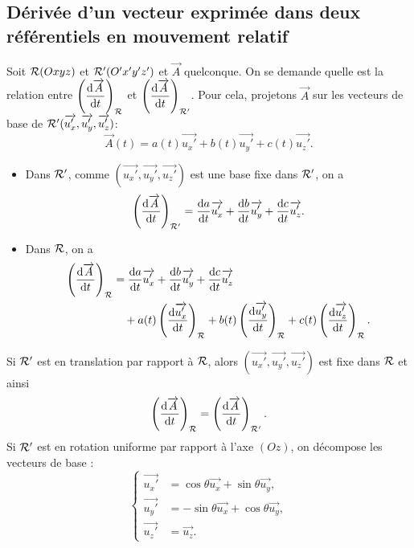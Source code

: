     \subsection{Dérivée d'un vecteur exprimée dans deux référentiels en mouvement relatif}

        Soit $\mathcal{R}(Oxyz)$ et $\mathcal{R}'(O'x'y'z')$ et $\vec{A}$ quelconque. On se demande quelle est la relation entre $\left(\dfrac{\mathrm{d}\protect\overrightarrow{{A}}}{\mathrm{d} t}\right)_{\mathcal{R}}$ et $\left(\dfrac{\mathrm{d}\protect\overrightarrow{{A}}}{\mathrm{d} t}\right)_{\mathcal{R}'}$. Pour cela, projetons $\vec{A}$ sur les vecteurs de base de $\mathcal{R}'(\protect\overrightarrow{{u_x'}},\protect\overrightarrow{{u_y'}},\protect\overrightarrow{{u_z'}})$:
        \begin{equation}
            \vec{A}(t) = a(t)\vec{u_x'}+b(t)\vec{u_y'}+c(t)\vec{u_z'}.
        \end{equation}

        \begin{itemize}
            \item Dans $\mathcal{R}'$, comme $(\vec{u_x'},\vec{u_y'},\vec{u_z'})$ est une base fixe dans $\mathcal{R}'$, on a 
            \begin{equation}
                \left(\frac{\mathrm{d}\protect\overrightarrow{{A}}}{\mathrm{d} t}\right)_{\mathcal{R}'}=\dfrac{\mathrm{d} a}{\mathrm{d} t}\protect\overrightarrow{{u_x'}}+\dfrac{\mathrm{d} b}{\mathrm{d} t}\protect\overrightarrow{{u_y'}}+\dfrac{\mathrm{d} c}{\mathrm{d} t}\protect\overrightarrow{{u_z'}}.
            \end{equation}
            \item Dans $\mathcal{R}$, on a 
            \begin{align}
                \left(\frac{\mathrm{d}\protect\overrightarrow{{A}}}{\mathrm{d} t}\right)_{\mathcal{R}}
                &=\frac{\mathrm{d} a}{\mathrm{d} t}\protect\overrightarrow{{u_x'}}+\frac{\mathrm{d} b}{\mathrm{d} t}\protect\overrightarrow{{u_y'}}+\frac{\mathrm{d} c}{\mathrm{d} t}\protect\overrightarrow{{u_z'}}\\
                &\quad+a(t)\left(\frac{\mathrm{d}\protect\overrightarrow{{u_x'}}}{\mathrm{d} t}\right)_{\mathcal{R}}+b(t)\left(\frac{\mathrm{d}\protect\overrightarrow{{u_y'}}}{\mathrm{d} t}\right)_{\mathcal{R}}+c(t)\left(\frac{\mathrm{d}\protect\overrightarrow{{u_z'}}}{\mathrm{d} t}\right)_{\mathcal{R}}.
            \end{align}
        \end{itemize}
        Si $\mathcal{R}'$ est en translation par rapport à $\mathcal{R}$, alors $(\vec{u_x'},\vec{u_y'},\vec{u_z'})$ est fixe dans $\mathcal{R}$ et ainsi 
        \begin{equation}
            \left(\dfrac{\mathrm{d}\protect\overrightarrow{{A}}}{\mathrm{d} t}\right)_{\mathcal{R}}=\left(\dfrac{\mathrm{d}\protect\overrightarrow{{A}}}{\mathrm{d} t}\right)_{\mathcal{R}'}.
        \end{equation}
        Si $\mathcal{R}'$ est en rotation uniforme par rapport à l'axe $(Oz)$, on décompose les vecteurs de base :
        \begin{equation}
            \left\lbrace
            \begin{aligned}
                \vec{u_x'} &= \cos\theta\vec{u_x}+\sin\theta\vec{u_y},\\
                \vec{u_y'} &= -\sin\theta\vec{u_x}+\cos\theta\vec{u_y},\\
                \vec{u_z'} &= \vec{u_z}.
            \end{aligned}
            \right.
        \end{equation}
